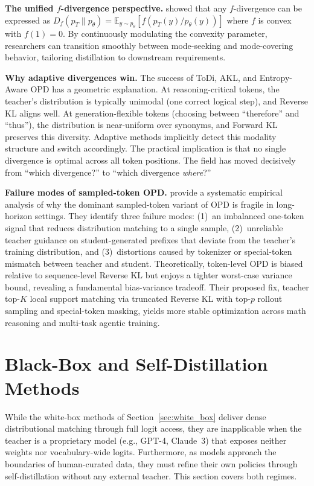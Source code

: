 \documentclass{article} %
\newcommand{\ptheta}{p_\theta}
\newcommand{\pteacher}{p_T}
\begin{document}
\textbf{The unified $f$-divergence perspective.}
\citet{2307.15190} showed that any $f$-divergence can be expressed as $D_f(\pteacher \parallel \ptheta) = \mathbb{E}_{y \sim \ptheta}[f(\pteacher(y)/\ptheta(y))]$ where $f$ is convex with $f(1)=0$. By continuously modulating the convexity parameter, researchers can transition smoothly between mode-seeking and mode-covering behavior, tailoring distillation to downstream requirements.

\textbf{Why adaptive divergences win.}
The success of ToDi, AKL, and Entropy-Aware OPD has a geometric explanation. At reasoning-critical tokens, the teacher's distribution is typically unimodal (one correct logical step), and Reverse KL aligns well. At generation-flexible tokens (choosing between ``therefore'' and ``thus''), the distribution is near-uniform over synonyms, and Forward KL preserves this diversity. Adaptive methods implicitly detect this modality structure and switch accordingly. The practical implication is that no single divergence is optimal across all token positions. The field has moved decisively from ``which divergence?'' to ``which divergence \emph{where}?''

\textbf{Failure modes of sampled-token OPD.}
\citet{2603.25562} provide a systematic empirical analysis of why the dominant sampled-token variant of OPD is fragile in long-horizon settings. They identify three failure modes: (1)~an imbalanced one-token signal that reduces distribution matching to a single sample, (2)~unreliable teacher guidance on student-generated prefixes that deviate from the teacher's training distribution, and (3)~distortions caused by tokenizer or special-token mismatch between teacher and student. Theoretically, token-level OPD is biased relative to sequence-level Reverse KL but enjoys a tighter worst-case variance bound, revealing a fundamental bias-variance tradeoff. Their proposed fix, teacher top-$K$ local support matching via truncated Reverse KL with top-$p$ rollout sampling and special-token masking, yields more stable optimization across math reasoning and multi-task agentic training.


\section{Black-Box and Self-Distillation Methods}
\label{sec:black_box}

While the white-box methods of Section~\ref{sec:white_box} deliver dense distributional matching through full logit access, they are inapplicable when the teacher is a proprietary model (e.g., GPT-4, Claude~3) that exposes neither weights nor vocabulary-wide logits. Furthermore, as models approach the boundaries of human-curated data, they must refine their own policies through self-distillation without any external teacher. This section covers both regimes.
\end{document}
